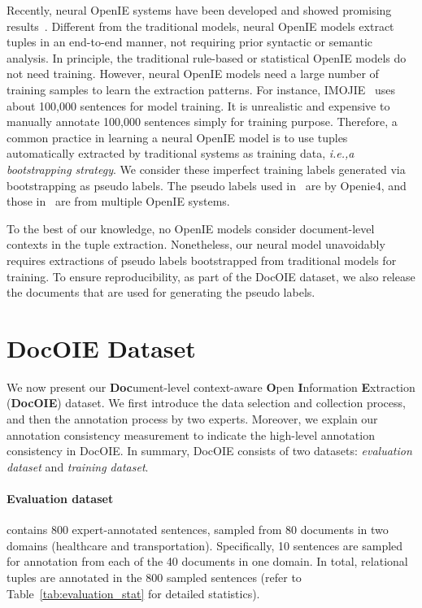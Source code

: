 \documentclass[11pt,a4paper]{article}
\newcommand{\ie}{\emph{i.e.,}\xspace}
\newcommand{\dname}{DocOIE\xspace}
\begin{document}
Recently, neural OpenIE systems have been developed and showed promising results~\cite{cui2018neural, zhan2020span, kolluru2020openie6, kolluru2020imojie}. Different from the traditional models, neural OpenIE models extract tuples in an end-to-end manner, not requiring prior syntactic or semantic analysis. In principle, the traditional rule-based or statistical OpenIE models do not need training. However, neural OpenIE models need a large number of training samples to learn the extraction patterns. For instance, IMOJIE~\cite{kolluru2020imojie} uses about 100,000 sentences for model training. It is unrealistic and expensive to manually annotate 100,000 sentences simply for training purpose. Therefore, a common practice in learning a neural OpenIE model is to use tuples automatically extracted by traditional systems as training data, \ie \textit{a bootstrapping strategy}. We consider these imperfect training labels generated via bootstrapping as pseudo labels. The pseudo labels used in~\cite{cui2018neural} are by Openie4, and those in~\cite{kolluru2020imojie} are from multiple OpenIE systems.

To the best of our knowledge, no OpenIE models consider document-level contexts in the tuple extraction. Nonetheless, our neural model unavoidably requires extractions of pseudo labels bootstrapped from traditional models for training. To ensure reproducibility, as part of the \dname dataset, we also release the documents that are used for generating the pseudo labels.    






\section{\dname Dataset}
\label{sec:dataset}


We now present our \textbf{Doc}ument-level context-aware \textbf{O}pen \textbf{I}nformation \textbf{E}xtraction (\textbf{\dname}) dataset. 
We first introduce the data selection and collection process, and then the annotation process by two experts. Moreover, we explain our annotation consistency measurement to indicate the high-level annotation consistency in \dname. In summary, \dname consists of two datasets: \textit{evaluation dataset} and \textit{training dataset}.
\paragraph{Evaluation dataset} contains 800 expert-annotated sentences, sampled from 80 documents in two  domains (healthcare and transportation). Specifically, 10 sentences are sampled for annotation from each of the 40 documents in one domain. In total,  relational tuples are annotated in the 800 sampled sentences (refer to Table~\ref{tab:evaluation_stat} for detailed statistics).
\end{document}
